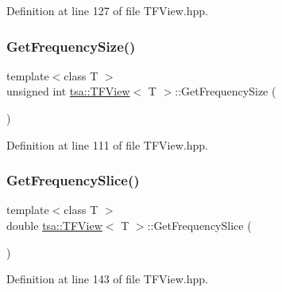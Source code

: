 Definition at line 127 of file T\+F\+View.\+hpp.

\mbox{\label{classtsa_1_1_t_f_view_a7dcdf5430baeedfb3170f4dcfbf9cd09}} 
\subsubsection{\texorpdfstring{Get\+Frequency\+Size()}{GetFrequencySize()}}
{\footnotesize\ttfamily template$<$class T $>$ \\
unsigned int \hyperlink{classtsa_1_1_t_f_view}{tsa\+::\+T\+F\+View}$<$ T $>$\+::Get\+Frequency\+Size (\begin{DoxyParamCaption}{ }\end{DoxyParamCaption})\hspace{0.3cm}{\ttfamily [inline]}}



Definition at line 111 of file T\+F\+View.\+hpp.

\mbox{\label{classtsa_1_1_t_f_view_abd84518db70471ee4dc9e1d19fd532ca}} 
\subsubsection{\texorpdfstring{Get\+Frequency\+Slice()}{GetFrequencySlice()}}
{\footnotesize\ttfamily template$<$class T $>$ \\
double \hyperlink{classtsa_1_1_t_f_view}{tsa\+::\+T\+F\+View}$<$ T $>$\+::Get\+Frequency\+Slice (\begin{DoxyParamCaption}{ }\end{DoxyParamCaption})\hspace{0.3cm}{\ttfamily [inline]}}



Definition at line 143 of file T\+F\+View.\+hpp.

\mbox{\label{classtsa_1_1_t_f_view_aca01f57f4015fa85e1b70e244d635eec}} 
